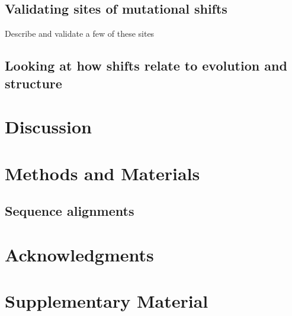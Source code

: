 \documentclass[9pt,lineno]{elife}
\begin{document}
\subsection*{Validating sites of mutational shifts}
Describe and validate a few of these sites

\subsection*{Looking at how shifts relate to evolution and structure}


\section{Discussion}


\section{Methods and Materials}

\subsection*{Sequence alignments}

\section{Acknowledgments}

\nocite{*} %


\section*{Supplementary Material}
\iffalse
\begin{supptab}
\caption{\label{supptab:phydms_replicates}
phydms analysis for all replicates
}
\end{supptab}

\begin{suppfig}
\caption{\label{suppfig:dms}
some plots about DMS
}
\end{suppfig}

\begin{suppfile}
\caption{\label{suppfile:grpM}
Alignment of all group M sequences numbered and aligned as ???
}
\end{suppfile}

\begin{suppfile}
\caption{\label{suppfile:cladeA}
Alignment of clade A sequences...
}
\end{suppfile}
\fi
\end{document}
